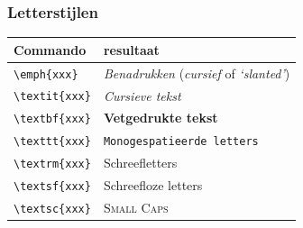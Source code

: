 \documentclass{beamer}
\begin{document}
\begin{frame}[fragile]
  \frametitle{Letterstijlen}
  
  \begin{center}
  \begin{tabular}{ll}
    \hline
    Commando & resultaat \\
    \hline
    \verb?\emph{xxx}?   & \emph{Benadrukken} (\textrm{\emph{cursief}} of \textsf{\emph{`slanted'}})\\
    \verb?\textit{xxx}? & \textit{Cursieve tekst} \\
    \verb?\textbf{xxx}? & \textbf{Vetgedrukte tekst} \\    
    \verb?\texttt{xxx}? & \texttt{Monogespatieerde letters} \\
    \verb?\textrm{xxx}? & \textrm{Schreefletters}  \\
    \verb?\textsf{xxx}? & \textsf{Schreefloze letters}  \\
    \verb?\textsc{xxx}? & \textsc{Small Caps} \\
  \end{tabular}
  \end{center}

\end{frame}
\end{document}
